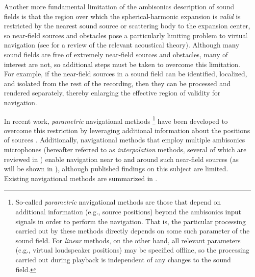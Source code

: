 Another more fundamental limitation of the ambisonics description of sound fields is that the region over which the spherical-harmonic expansion is \textit{valid} is restricted by the nearest sound source or scattering body to the expansion center, so near-field sources and obstacles pose a particularly limiting problem to virtual navigation (see  for a review of the relevant acoustical theory).
Although many sound fields are free of extremely near-field sources and obstacles, many of interest are not, so additional steps must be taken to overcome this limitation.
For example, if the near-field sources in a sound field can be identified, localized, and isolated from the rest of the recording, then they can be processed and rendered separately, thereby enlarging the effective region of validity for navigation.

In recent work, \textit{parametric} navigational methods%
\footnote{So-called \textit{parametric} navigational methods are those that depend on additional information (e.g., source positions) beyond the ambisonics input signals in order to perform the navigation.
That is, the particular processing carried out by these methods directly depends on some such parameter of the sound field.
For \textit{linear} methods, on the other hand, all relevant parameters (e.g., virtual loudspeaker positions) may be specified offline, so the processing carried out during playback is independent of any changes to the sound field.}
have been developed to overcome this restriction by leveraging additional information about the positions of sources \citep{TylkaChoueiri2016,Wakayama2017}.
Additionally, navigational methods that employ multiple ambisonics microphones (hereafter referred to as \textit{interpolation} methods, several of which are reviewed in ) enable navigation near to and around such near-field sources \citep{TylkaChoueiri2016,Thiergart2013,Zheng2013PhD} (as will be shown in ), although published findings on this subject are limited.
Existing navigational methods are summarized in .



